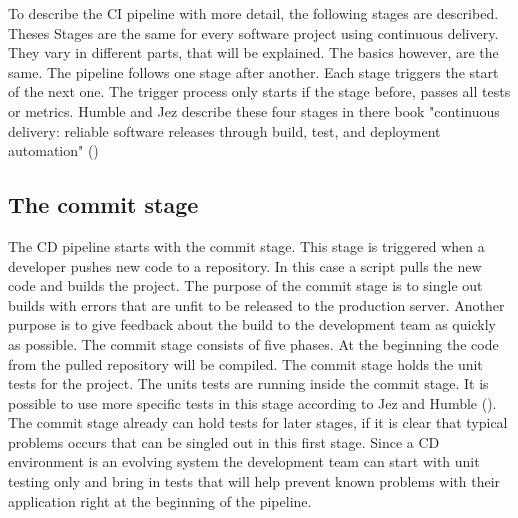 To describe the CI pipeline with more detail, the following stages are described. Theses Stages are the same for every software project using
continuous delivery. They vary in different parts,  that will be explained. The basics however, are the same. The pipeline follows one stage after another.
Each stage triggers the start of the next one. The trigger process only starts if the stage before, passes all tests or metrics.
Humble and Jez describe these four stages in there book "continuous delivery: reliable software releases through build,
test, and deployment automation" (\cite{humble2010continuous})

\subsection{The commit stage}
The CD pipeline starts with the commit stage. This stage is triggered when a developer pushes new code to a repository.
In this case a script pulls the new code and builds the project. The purpose of the commit stage is to single out builds with errors that
are unfit to be released to the production server.  Another purpose is to give feedback about the build to the development team as quickly as possible.
The commit stage consists of five phases. At the beginning the code from the pulled repository will be compiled. The commit stage holds the unit
tests for the project. The units tests are running inside the commit stage. It is possible to use more specific tests in this stage according to Jez and Humble
(\cite{humble2010continuous}). The commit stage already can hold tests for later stages, if it is clear that typical problems occurs that can be singled out
in this first stage. Since a CD environment is an evolving system the development team can start with unit testing only and bring in tests
that will help prevent known problems with their application right at the beginning of the pipeline.

